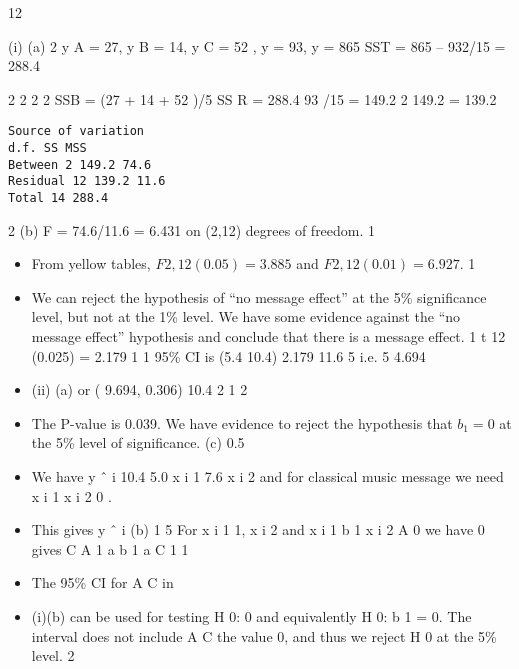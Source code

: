 \documentclass[a4paper,12pt]{article}
\begin{document}
\newpage
12
\item (i)
(a)
2
y A = 27, y B = 14, y C = 52 , y = 93, y = 865
SST = 865 – 932/15 = 288.4

2
2
2
2
SSB = (27 + 14 + 52 )/5
SS R = 288.4
93 /15 = 149.2
2
149.2 = 139.2
\begin{verbatim}
Source of variation
d.f. SS MSS
Between 2 149.2 74.6
Residual 12 139.2 11.6
Total 14 288.4
\end{verbatim}
2
(b)
F = 74.6/11.6 = 6.431 on (2,12) degrees of freedom. 1
\begin{itemize}
\item From yellow tables, $F 2,12 (0.05) = 3.885$ and $F 2,12 (0.01) = 6.927$. 1
\item We can reject the hypothesis of “no message effect” at the 5\% significance level, but not at the 1\% level. We have some evidence
against the “no message effect” hypothesis and conclude that there is a message effect. 1
t 12 (0.025) = 2.179 1
1
95\% CI is (5.4 10.4) 2.179 11.6
5
i.e. 5 4.694
\item (ii)
(a)
or ( 9.694, 0.306)
10.4
2
1
2
\item The P-value is 0.039. We have evidence to reject the hypothesis that $b_1 = 0$ at the 5\% level of significance.
(c)
0.5
\item We have y ˆ i 10.4 5.0 x i 1 7.6 x i 2 and for classical music message we need x i 1 x i 2 0 .

\item This gives y ˆ i
(b)
1
5
For x i 1 1, x i 2
and x i 1
b 1
x i 2
A
0 we have
0 gives
C
A
1
a b 1
a
C
1
1
\item The 95\% CI for A C in \item (i)(b) can be used for testing H 0: 0 and equivalently H 0: b 1 = 0. The interval does not include
A
C
the value 0, and thus we reject H 0 at the 5\% level.
2
\end{itemize}
\end{document}
